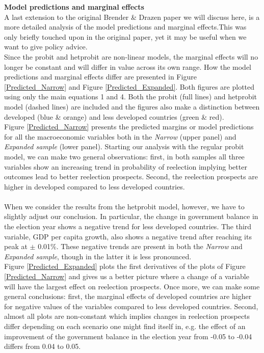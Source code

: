 \documentclass[12pt]{article}
\begin{document}
\textbf{Model predictions and marginal effects}\\
A last extension to the original Brender \& Drazen paper we will discuss here, is a more detailed analysis of the model predictions and marginal effects.This was only briefly touched upon in the original paper, yet it may be useful when we want to give policy advice.\\
Since the probit and hetprobit are non-linear models, the marginal effects will no longer be constant and will differ in value across its own range. How the model predictions and marginal effects differ are presented in Figure \ref{Predicted_Narrow} and Figure \ref{Predicted_Expanded}. Both figures are plotted using only the main equations 1 and 4. Both the probit (full lines) and hetprobit model (dashed lines) are included and the figures also make a distinction between developed (blue \& orange) and less developed countries (green \& red).\\
Figure \ref{Predicted_Narrow}  presents the predicted margins or model predictions for all the macroeconomic variables both in the \textit{Narrow} (upper panel) and \textit{Expanded sample} (lower panel). Starting our analysis with the regular probit model, we can make two general observations: first, in both samples all three variables show an increasing trend in probability of reelection implying better outcomes lead to better reelection prospects. Second, the reelection prospects are higher in developed compared to less developed countries.\\
\\
When we consider the results from the hetprobit model, however, we have to slightly adjust our conclusion. In particular, the change in government balance in the election year shows a negative trend for less developed countries. The third variable, GDP per capita growth, also shows a negative trend after reaching its peak at $\pm$ 0.01\%. These negative trends are present in both the \textit{Narrow} and \textit{Expanded sample}, though in the latter it is less pronounced.\\
Figure \ref{Predicted_Expanded} plots the first derivatives of the plots of Figure \ref{Predicted_Narrow} and gives us a better picture where a change of a variable will have the largest effect on reelection prospects. Once more, we can make some general conclusions: first, the marginal effects of developed countries are higher for negative values of the variables compared to less developed countries. Second, almost all plots are non-constant which implies changes in reelection prospects differ depending on each scenario one might find itself in, e.g. the effect of an improvement of the government balance in the election year from -0.05 to -0.04 differs from 0.04 to 0.05.\\   
\end{document}
